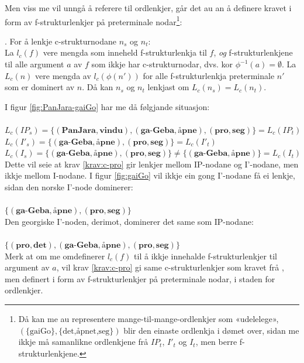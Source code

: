 \documentclass[12pt,a4paper,oneside,draft]{report}
\begin{document}
Men viss me vil unngå å referere til ordlenkjer, går det au an å
definere kravet i form av f\hyp{}strukturlenkjer på preterminale
nodar\footnote{Då kan me au representere mange-til-mange-ordlenkjer som
        «udelelege», $(\{\text{gaiGo}\},\{\text{det,åpnet,seg}\})$
        blir den einaste ordlenkja i dømet over, sidan me ikkje må
        samanlikne ordlenkjene frå $IP_t$, $I'_t$ og $I_t$, men berre
        f-strukturlenkjene. }:

\ex. \label{krav:c-pro} For å lenkje c\hyp{}strukturnodane $n_s$ og
     $n_t$:\\
     La $l_c(f)$ vere mengda som inneheld
     f\hyp{}strukturlenkja til $f$, \emph{og} f\hyp{}strukturlenkjene til alle
     argument $a$ av $f$ som ikkje har c\hyp{}strukturnodar, dvs. kor
     $\phi^{-1}(a)=\emptyset$.
     La $L_c(n)$ vere mengda av $l_c(\phi(n'))$ for alle
     f\hyp{}strukturlenkja preterminale $n'$ som er dominert av $n$.
     Då kan $n_s$ og $n_t$ lenkjast om $L_c(n_s)=L_c(n_t)$.

I figur \ref{fig:PanJara-gaiGo} har me då følgjande situasjon:\\
\\$L_c(IP_s)=\{(\textbf{PanJara},\textbf{vindu}),(\textbf{ga-Geba},\textbf{åpne}),(\textbf{pro},\textbf{seg})\}=L_c(IP_t)$
\\$L_c(I'_s)=\{(\textbf{ga-Geba},\textbf{åpne}),(\textbf{pro},\textbf{seg})\}=L_c(I'_t)$
\\$L_c(I_s)=\{(\textbf{ga-Geba},\textbf{åpne}),(\textbf{pro},\textbf{seg})\}
\neq \{(\textbf{ga-Geba},\textbf{åpne})\}=L_c(I_t)$\\

Dette vil seie at krav \ref{krav:c-pro} gir lenkjer mellom
IP-nodane og I'-nodane, men ikkje mellom I-nodane. I figur
\ref{fig:gaiGo} vil ikkje ein gong I'-nodane få ei lenkje, sidan den
norske I'-node dominerer:\\
\\$\{(\textbf{ga-Geba},\textbf{åpne}), (\textbf{pro},\textbf{seg})\}$\\

Den georgiske I'-noden, derimot, dominerer det same som IP-nodane:\\
\\$\{ (\textbf{pro},\textbf{det}), (\textbf{ga-Geba},\textbf{åpne}),
(\textbf{pro},\textbf{seg}) \}$\\

Merk at om me omdefinerer $l_c(f)$ til å ikkje innehalde
f\hyp{}strukturlenkjer til argument av $a$, vil krav \ref{krav:c-pro} gi
same c\hyp{}strukturlenkjer som kravet frå \cite{dyvik2009lmp}, men
definert i form av f\hyp{}strukturlenkjer på preterminale nodar, i
staden for ordlenkjer.
\end{document}
